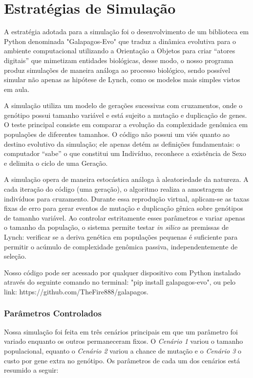 \section{Estratégias de Simulação}

A estratégia adotada para a simulação foi o desenvolvimento de um biblioteca em Python denominada "Galapagos-Evo" que traduz a dinâmica evolutiva para o ambiente computacional utilizando a Orientação a Objetos para criar ``atores digitais'' que mimetizam entidades biológicas, desse modo, o nosso programa produz simulações de maneira análoga ao processo biológico, sendo possível simular não apenas as hipótese de Lynch, como os modelos mais simples vistos em aula.

A simulação utiliza um modelo de gerações sucessivas com cruzamentos, onde o genótipo possui tamanho variável e está sujeito a mutação e duplicação de genes. O teste principal consiste em comparar a evolução da complexidade genômica em populações de diferentes tamanhos. O código não possui um viés quanto ao destino evolutivo da simulação; ele apenas detém as definições fundamentais: o computador ``sabe'' o que constitui um Indivíduo, reconhece a existência de Sexo e delimita o ciclo de uma Geração.

A simulação opera de maneira estocástica  análoga à aleatoriedade da natureza. A cada iteração do código (uma geração), o algoritmo realiza a amostragem de indivíduos para cruzamento. Durante essa reprodução virtual, aplicam-se as taxas fixas de erro para gerar eventos de mutação e duplicação gênica sobre genótipos de tamanho variável. Ao controlar estritamente esses parâmetros e variar apenas o tamanho da população, o sistema permite testar \textit{in silico} as premissas de Lynch: verificar se a deriva genética em populações pequenas é suficiente para permitir o acúmulo de complexidade genômica passiva, independentemente de seleção.

Nosso código pode ser acessado por qualquer dispositivo com Python instalado através do seguinte comando no terminal: "pip install galapagos-evo", ou pelo link: https://github.com/TheFire888/galapagos.

\subsubsection*{Parâmetros Controlados} %
Nossa simulação foi feita em três cenários principais em que um parâmetro foi variado enquanto os outros permaneceram fixos. O \textit{Cenário 1} variou o tamanho populacional, equanto o \textit{Cenário 2} variou a chance de mutação e o \textit{Cenário 3} o custo por gene extra no genótipo. Os parâmetros de cada um dos cenários está resumido a seguir:

